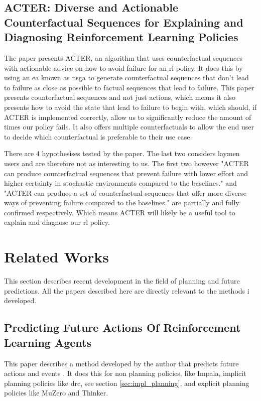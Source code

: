 \documentclass[UKenglish]{uiomasterthesis}
\begin{document}
\subsection{ACTER: Diverse and Actionable Counterfactual Sequences for Explaining and Diagnosing Reinforcement Learning Policies}
\label{sec:acter}
The paper presents ACTER, an algorithm that uses counterfactual sequences with actionable advice on how to avoid failure for an \ac{rl} policy. It does this by using an \ac{ea} known as \ac{nsga} to generate counterfactual sequences that don't lead to failure as close as possible to factual sequences that lead to failure. This paper presents counterfactual sequences and not just actions, which means it also presents how to avoid the state that lead to failure to begin with, which should, if ACTER is implemented correctly, allow us to significantly reduce the amount of times our policy fails. It also offers multiple counterfactuals to allow the end user to decide which counterfactual is preferable to their use case.

There are 4 hypothesises tested by the paper. The last two considers laymen users and are therefore not as interesting to us. The first two however "ACTER can produce counterfactual sequences that prevent failure with lower effort and higher certainty in stochastic environments compared to the baselines." and "ACTER can produce a set of counterfactual sequences that offer more diverse ways of preventing failure compared to the baselines." are partially and fully confirmed respectively. Which means ACTER will likely be a useful tool to explain and diagnose our \ac{rl} policy.


\section{Related Works}
This section describes recent development in the field of planning and future predictions. All the papers described here are directly relevant to the methods i developed.

\subsection{Predicting Future Actions Of Reinforcement Learning Agents}
\label{sec:predicting_actions}
This paper describes a method developed by the author that predicts future actions and events \cite{chung2024predictingfutureactionsreinforcement}. It does this for non planning policies, like Impala, implicit planning policies like \ac{drc}, see section \ref{sec:impl_planning}, and explicit planning policies like MuZero and Thinker.
\end{document}

